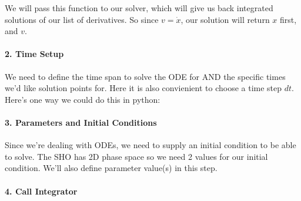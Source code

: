 We will pass this function to our solver, which will give us back
integrated solutions of our list of derivatives. So since
\(v = \dot{x}\), our solution will return \(x\) first, and \(v\).

\paragraph{2. Time Setup}\label{time-setup}

We need to define the time span to solve the ODE for AND the specific
times we'd like solution points for. Here it is also convienient to
choose a time step \(dt\). Here's one way we could do this in python:

\begin{Shaded}
\begin{Highlighting}[]
\OperatorTok{=} 
\OperatorTok{=} 
\OperatorTok{=}\NormalTok{ (}
\OperatorTok{=}
\end{Highlighting}
\end{Shaded}

\paragraph{3. Parameters and Initial
Conditions}\label{parameters-and-initial-conditions}

Since we're dealing with ODEs, we need to supply an initial condition to
be able to solve. The SHO has 2D phase space so we need 2 values for our
initial condition. We'll also define parameter value(s) in this step.

\begin{Shaded}
\begin{Highlighting}[]
\OperatorTok{=} 
\OperatorTok{=}\NormalTok{ [}\NormalTok{, }\NormalTok{] }
\end{Highlighting}
\end{Shaded}

\paragraph{4. Call Integrator}\label{call-integrator}

